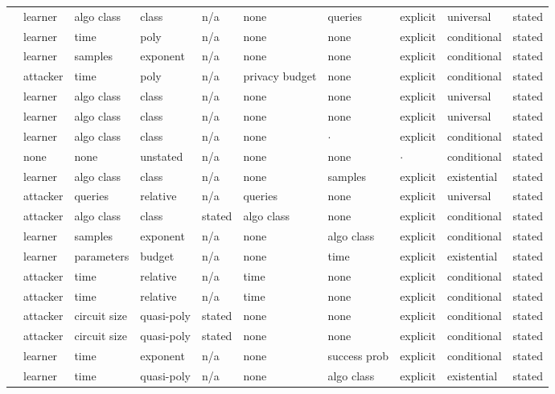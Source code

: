 \begin{landscape}
\begin{longtable}{rlllllllll}
\cite{DGKP20} & learner & algo class & class & n/a & none & queries & explicit & universal & stated \\
\cite{HN23} & learner & time & poly & n/a & none & none & explicit & conditional & stated \\
\cite{TME25} & learner & samples & exponent & n/a & none & none & explicit & conditional & stated \\
\cite{GKY11} & attacker & time & poly & n/a & privacy budget & none & explicit & conditional & stated \\
\cite{CGGV25} & learner & algo class & class & n/a & none & none & explicit & universal & stated \\
\cite{SW22} & learner & algo class & class & n/a & none & none & explicit & universal & stated \\
\cite{Wei25} & learner & algo class & class & n/a & none & $\cdot$ & explicit & conditional & stated \\
\cite{CQYKMHBW24} & none & none & unstated & n/a & none & none & $\cdot$ & conditional & stated \\
\cite{ABM22} & learner & algo class & class & n/a & none & samples & explicit & existential & stated \\
\cite{BM09} & attacker & queries & relative & n/a & queries & none & explicit & universal & stated \\
\cite{WSPX24} & attacker & algo class & class & stated & algo class & none & explicit & conditional & stated \\
\cite{DKLM26} & learner & samples & exponent & n/a & none & algo class & explicit & conditional & stated \\
\cite{GJMMW22} & learner & parameters & budget & n/a & none & time & explicit & existential & stated \\
\cite{BGHKP24} & attacker & time & relative & n/a & time & none & explicit & conditional & stated \\
\cite{LLW19} & attacker & time & relative & n/a & time & none & explicit & conditional & stated \\
\cite{BW08} & attacker & circuit size & quasi-poly & stated & none & none & explicit & conditional & stated \\
\cite{GHJS25} & attacker & circuit size & quasi-poly & stated & none & none & explicit & conditional & stated \\
\cite{KPR25} & learner & time & exponent & n/a & none & success prob & explicit & conditional & stated \\
\cite{BHJK25} & learner & time & quasi-poly & n/a & none & algo class & explicit & existential & stated \\

\end{longtable}
\end{landscape}
